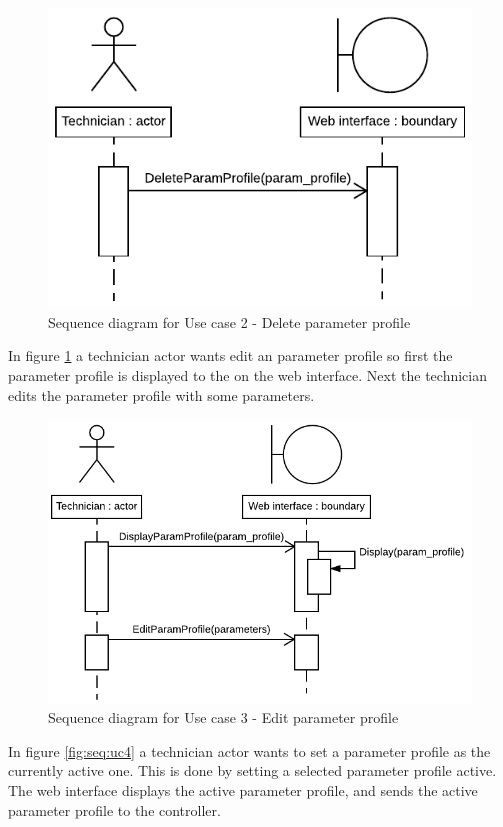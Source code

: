\begin{figure}[H]
	\centering
	\includegraphics[width=0.7\linewidth]{Images/System_architecture/Use_case_2_SD}
	\caption{Sequence diagram for Use case 2 - Delete parameter profile}
	\label{fig:seq:uc2}
\end{figure}

In figure \ref{fig:seq:uc2} a technician actor wants edit an parameter profile so first the parameter profile is displayed to the on the web interface. Next the technician edits the parameter profile with some parameters.

\begin{figure}[H]
	\centering
	\includegraphics[width=1\linewidth]{Images/System_architecture/Use_case_3_SD}
	\caption{Sequence diagram for Use case 3 - Edit parameter profile}
	\label{fig:seq:uc3}
\end{figure}

In figure \ref{fig:seq:uc4} a technician actor wants to set a parameter profile as the currently active one. This is done by setting a selected parameter profile active. The web interface displays the active parameter profile, and sends the active parameter profile to the controller.

